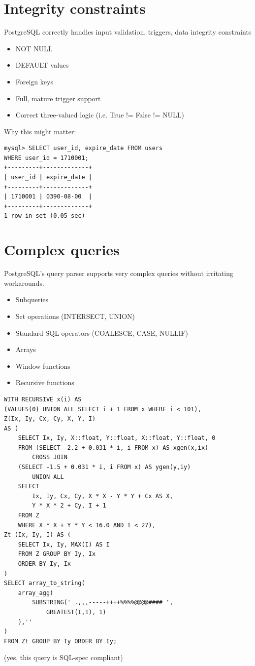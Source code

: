 \documentclass[svgnames]{beamer}
\begin{document}
\section{Integrity constraints}
\begin{frame}[fragile]
PostgreSQL correctly handles input validation, triggers, data integrity constraints
\begin{itemize}
    \item NOT NULL
    \item DEFAULT values
    \item Foreign keys
    \item Full, mature trigger support
    \item Correct three-valued logic (i.e. True != False != NULL)
\end{itemize}
Why this might matter:
\small
\begin{verbatim}
mysql> SELECT user_id, expire_date FROM users
WHERE user_id = 1710001;
+---------+-------------+
| user_id | expire_date |
+---------+-------------+
| 1710001 | 0390-08-00  | 
+---------+-------------+
1 row in set (0.05 sec)
\end{verbatim}
\normalsize
\end{frame}

\section{Complex queries}
\begin{frame}
PostgreSQL's query parser supports very complex queries without irritating workarounds.
\begin{itemize}
    \item Subqueries
    \item Set operations (INTERSECT, UNION)
    \item Standard SQL operators (COALESCE, CASE, NULLIF)
    \item Arrays
    \item Window functions
    \item Recursive functions
\end{itemize}
\end{frame}

\begin{frame}[fragile]
    \tiny
    \begin{verbatim}
WITH RECURSIVE x(i) AS
(VALUES(0) UNION ALL SELECT i + 1 FROM x WHERE i < 101),
Z(Ix, Iy, Cx, Cy, X, Y, I)
AS (
    SELECT Ix, Iy, X::float, Y::float, X::float, Y::float, 0
    FROM (SELECT -2.2 + 0.031 * i, i FROM x) AS xgen(x,ix)
        CROSS JOIN
    (SELECT -1.5 + 0.031 * i, i FROM x) AS ygen(y,iy)
        UNION ALL
    SELECT
        Ix, Iy, Cx, Cy, X * X - Y * Y + Cx AS X,
        Y * X * 2 + Cy, I + 1
    FROM Z
    WHERE X * X + Y * Y < 16.0 AND I < 27),
Zt (Ix, Iy, I) AS (
    SELECT Ix, Iy, MAX(I) AS I
    FROM Z GROUP BY Iy, Ix
    ORDER BY Iy, Ix
)
SELECT array_to_string(
    array_agg(
        SUBSTRING(' .,,,-----++++%%%%@@@@#### ',
            GREATEST(I,1), 1)
    ),''
)
FROM Zt GROUP BY Iy ORDER BY Iy;
    \end{verbatim}
    \normalsize
    (yes, this query is SQL-spec compliant)
\end{frame}
\end{document}
